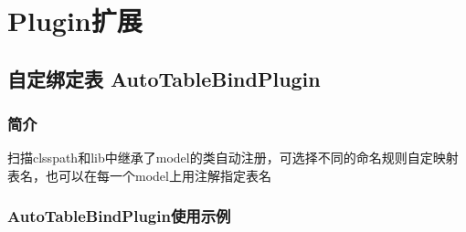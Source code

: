 \documentclass{scrartcl}
\begin{document}
\section{Plugin扩展}
\label{sec-2}
\subsection{自定绑定表 AutoTableBindPlugin}
\label{sec-2-1}
\subsubsection{简介}
\label{sec-2-1-1}

   扫描clsspath和lib中继承了model的类自动注册，可选择不同的命名规则自定映射表名，也可以在每一个model上用注解指定表名
\subsubsection{AutoTableBindPlugin使用示例}
\label{sec-2-1-2}
\end{document}
